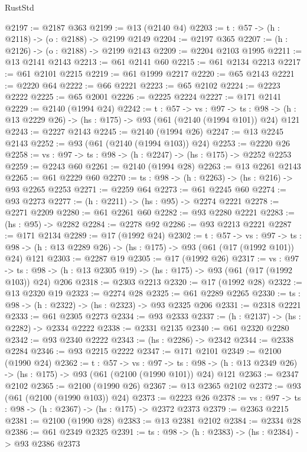 \begin{lexlean}{RustStd}
\begin{coremodule}
@2197 := @2187 @363
@2199 := @13 (@2140 @4)
@2203 := {t : @57} -> (h : @2118) -> (o : @2188) -> @2199 @2149
@2204 := @2197 @365
@2207 := (h : @2126) -> (o : @2188) -> @2199 @2143
@2209 := @2204 @2103 @1995
@2211 := @13 @2141 @2143
@2213 := @61 @2141 @60
@2215 := @61 @2134 @2213
@2217 := @61 @2101 @2215
@2219 := @61 @1999 @2217
@2220 := @65 @2143
@2221 := @2220 @64
@2222 := @66 @2221
@2223 := @65 @2102
@2224 := @2223 @2222
@2225 := @65 @2001
@2226 := @2225 @2224
@2227 := @171 @2141
@2229 := @2140 (@1994 @24)
@2242 := {t : @57} ->
  {vs : @97} ->
  {ts : @98} -> (h : @13 @2229 @26) -> (hs : @175) -> @93 (@61 (@2140 (@1994 @101)) @24) @121
@2243 := @2227 @2143
@2245 := @2140 (@1994 @26)
@2247 := @13 @2245 @2143
@2252 := @93 (@61 (@2140 (@1994 @103)) @24)
@2253 := @2220 @26
@2258 := {vs : @97} -> {ts : @98} -> (h : @2247) -> (hs : @175) -> @2252 @2253
@2259 := @2243 @60
@2261 := @2140 (@1994 @28)
@2263 := @13 @2261 @2143
@2265 := @61 @2229 @60
@2270 := {ts : @98} -> (h : @2263) -> (hs : @216) -> @93 @2265 @2253
@2271 := @2259 @64
@2273 := @61 @2245 @60
@2274 := @93 @2273
@2277 := (h : @2211) -> (hs : @95) -> @2274 @2221
@2278 := @2271 @2209
@2280 := @61 @2261 @60
@2282 := @93 @2280 @2221
@2283 := (hs : @95) -> @2282
@2284 := @2278 @92
@2286 := @93 @2213 @2221
@2287 := @171 @2134
@2289 := @17 (@1992 @24)
@2302 := {t : @57} ->
  {vs : @97} ->
  {ts : @98} -> (h : @13 @2289 @26) -> (hs : @175) -> @93 (@61 (@17 (@1992 @101)) @24) @121
@2303 := @2287 @19
@2305 := @17 (@1992 @26)
@2317 := {vs : @97} ->
  {ts : @98} -> (h : @13 @2305 @19) -> (hs : @175) -> @93 (@61 (@17 (@1992 @103)) @24) @206
@2318 := @2303 @2213
@2320 := @17 (@1992 @28)
@2322 := @13 @2320 @19
@2323 := @2274 @28
@2325 := @61 @2289 @2265
@2330 := {ts : @98} -> (h : @2322) -> (hs : @2323) -> @93 @2325 @206
@2331 := @2318 @2221
@2333 := @61 @2305 @2273
@2334 := @93 @2333
@2337 := (h : @2137) -> (hs : @2282) -> @2334 @2222
@2338 := @2331 @2135
@2340 := @61 @2320 @2280
@2342 := @93 @2340 @2222
@2343 := (hs : @2286) -> @2342
@2344 := @2338 @2284
@2346 := @93 @2215 @2222
@2347 := @171 @2101
@2349 := @2100 (@1990 @24)
@2362 := {t : @57} ->
  {vs : @97} ->
  {ts : @98} -> (h : @13 @2349 @26) -> (hs : @175) -> @93 (@61 (@2100 (@1990 @101)) @24) @121
@2363 := @2347 @2102
@2365 := @2100 (@1990 @26)
@2367 := @13 @2365 @2102
@2372 := @93 (@61 (@2100 (@1990 @103)) @24)
@2373 := @2223 @26
@2378 := {vs : @97} -> {ts : @98} -> (h : @2367) -> (hs : @175) -> @2372 @2373
@2379 := @2363 @2215
@2381 := @2100 (@1990 @28)
@2383 := @13 @2381 @2102
@2384 := @2334 @28
@2386 := @61 @2349 @2325
@2391 := {ts : @98} -> (h : @2383) -> (hs : @2384) -> @93 @2386 @2373

\end{coremodule}
\end{lexlean}
